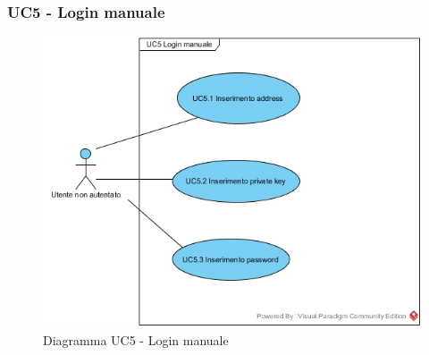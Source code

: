 \subsubsection{UC5 - Login manuale}
\begin{figure}[h]
	\centering
	\includegraphics[width=0.8\linewidth]{res/img/UC5.jpg}
	\caption{Diagramma UC5 - Login manuale}
\end{figure}
